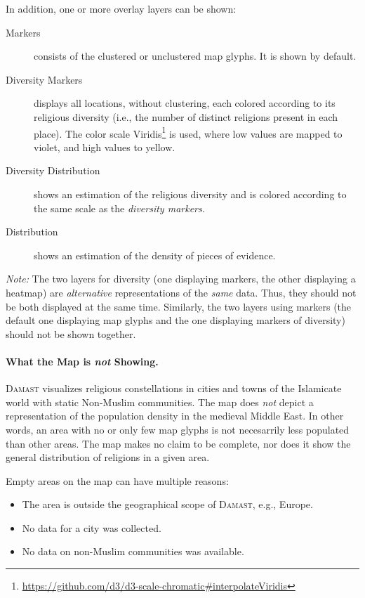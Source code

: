 In addition, one or more overlay layers can be shown:

\begin{description}
  \item[Markers]
    consists of the clustered or unclustered map glyphs. It is shown by default.
  \item[Diversity Markers]
    displays all locations, without clustering, each colored according to its religious diversity (i.e., the number of distinct religions present in each place). The color scale Viridis\footnote{\url{https://github.com/d3/d3-scale-chromatic\#interpolateViridis}} is used, where low values are mapped to violet, and high values to yellow.
  \item[Diversity Distribution]
    shows an estimation of the religious diversity and is colored according to the same scale as the \emph{diversity markers.}
  \item[Distribution]
    shows an estimation of the density of pieces of evidence.
\end{description}

\emph{Note:} The two layers for diversity (one displaying markers, the other displaying a heatmap) are \emph{alternative} representations of the \emph{same} data.
Thus, they should not be both displayed at the same time.
Similarly, the two layers using markers (the default one displaying map glyphs and the one displaying markers of diversity) should not be shown together.


\paragraph{What the Map is \emph{not} Showing.}
\textsc{Damast} visualizes religious constellations in cities and towns of the Islamicate world with static Non-Muslim communities.
The map does \emph{not} depict a representation of the population density in the medieval Middle East.
In other words, an area with no or only few map glyphs is not necesarrily less populated than other areas.
The map makes no claim to be complete, nor does it show the general distribution of religions in a given area.

Empty areas on the map can have multiple reasons:

\begin{itemize}
  \item The area is outside the geographical scope of \textsc{Damast}, e.g., Europe.
  \item No data for a city was collected.
  \item No data on non-Muslim communities was available.
\end{itemize}

